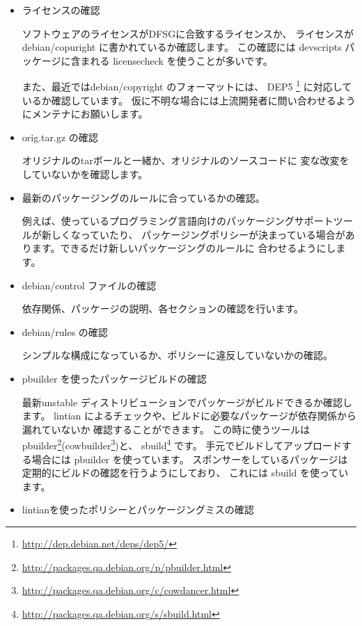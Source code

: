 \documentclass[mingoth,a4paper]{jsarticle}
\begin{document}
\begin{itemize}

\item ライセンスの確認

ソフトウェアのライセンスがDFSGに合致するライセンスか、
ライセンスが debian/copuright に書かれているか確認します。
この確認には devscripts パッケージに含まれる licensecheck を使うことが多いです。

また、最近ではdebian/copyright のフォーマットには、
DEP5
\footnote{\url{http://dep.debian.net/deps/dep5/}}
に対応しているか確認しています。
仮に不明な場合には上流開発者に問い合わせるようにメンテナにお願いします。

\item orig.tar.gz の確認

オリジナルのtarボールと一緒か、オリジナルのソースコードに
変な改変をしていないかを確認します。

\item 最新のパッケージングのルールに合っているかの確認。

例えば、使っているプログラミング言語向けのパッケージングサポートツールが新しくなっていたり、
パッケージングポリシーが決まっている場合があります。できるだけ新しいパッケージングのルールに
合わせるようにします。

\item debian/control ファイルの確認

依存関係、パッケージの説明、各セクションの確認を行います。

\item debian/rules の確認

シンプルな構成になっているか、ポリシーに違反していないかの確認。

\item pbuilder を使ったパッケージビルドの確認

最新unstable ディストリビューションでパッケージがビルドできるか確認します。
lintian によるチェックや、ビルドに必要なパッケージが依存関係から漏れていないか
確認することができます。
この時に使うツールは pbuilder\footnote{\url{http://packages.qa.debian.org/p/pbuilder.html}}(cowbuilder\footnote{\url{http://packages.qa.debian.org/c/cowdancer.html}})と、
sbuild\footnote{\url{http://packages.qa.debian.org/s/sbuild.html}} です。
手元でビルドしてアップロードする場合には pbuilder を使っています。
スポンサーをしているパッケージは定期的にビルドの確認を行うようにしており、
これには sbuild を使っています。

\item lintianを使ったポリシーとパッケージングミスの確認


\end{itemize}
\end{document}
